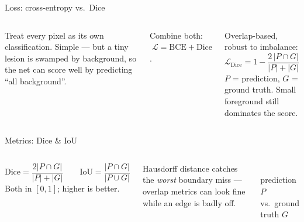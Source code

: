 \documentclass[
11pt,notheorems,hyperref={pdfauthor=whatever}
]{beamer}
\begin{document}
\begin{frame}{Loss: cross-entropy vs.\ Dice}
\small
\begin{columns}[T,onlytextwidth]
    \begin{tcolorbox}[medicalglass, title=\textbf{\color{accTeal}Pixelwise cross-entropy}]
    Treat every pixel as its own classification. Simple --- but a \alert{tiny lesion} is
    swamped by background, so the net can score well by predicting ``all background''.
    \end{tcolorbox}
    \begin{tcolorbox}[medicalglass, title=\textbf{\color{accGreen}In practice}]
    Combine both: $\;\mathcal{L}=\text{BCE}+\text{Dice}$.
    \end{tcolorbox}

    \begin{tcolorbox}[medicalglass, title=\textbf{\color{accAmber}Dice loss}]
    Overlap-based, robust to imbalance:
    \[
    \mathcal{L}_{\text{Dice}} = 1 - \frac{2\,|P\cap G|}{|P|+|G|}
    \]
    $P$ = prediction, $G$ = ground truth. Small foreground still dominates the score.
    \end{tcolorbox}
\end{columns}
\end{frame}

\begin{frame}{Metrics: Dice \& IoU}
\small
\begin{columns}[c,onlytextwidth]
    \begin{tcolorbox}[medicalglass, title=\textbf{\color{accGreen}Overlap metrics}]
    \[
    \text{Dice}=\frac{2|P\cap G|}{|P|+|G|}
    \qquad
    \text{IoU}=\frac{|P\cap G|}{|P\cup G|}
    \]
    Both in $[0,1]$; higher is better.
    \end{tcolorbox}
    \begin{tcolorbox}[medicalglass, title=\textbf{\color{accAmber}Boundary error}]
    Hausdorff distance catches the \emph{worst} boundary miss --- overlap metrics can look
    fine while an edge is badly off.
    \end{tcolorbox}

    \centering
    \\[0.3em]
    {\tiny \color{gray!55} prediction $P$ vs.\ ground truth $G$}
\end{columns}
\end{frame}
\end{document}
